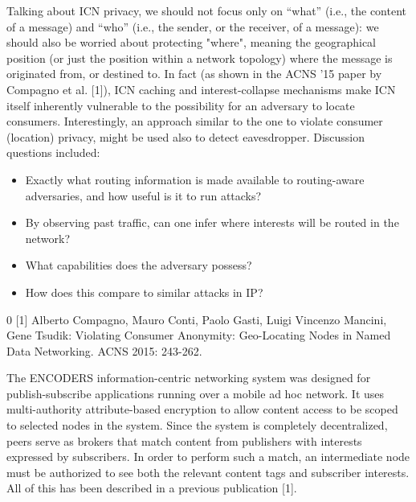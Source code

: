 \documentclass[a4paper,UKenglish]{dagrep}
\begin{document}
\license

Talking about ICN privacy, we should not focus only on ``what'' (i.e., the content of a message) and ``who'' (i.e., the sender, or the receiver, of a message): we should also be worried about protecting "where", meaning the geographical position (or just the position within a network topology) where the message is originated from, or destined to. In fact (as shown in the ACNS '15 paper by Compagno et al. [1]), ICN caching and interest-collapse mechanisms make ICN itself inherently vulnerable to the possibility for an adversary to locate consumers.
Interestingly, an approach similar to the one to violate consumer (location) privacy, might be used also to detect eavesdropper.
Discussion questions included:
\begin{itemize}
\item Exactly what routing information is made available to routing-aware adversaries, and how useful is it to run attacks?
\item By observing past traffic, can one infer where interests will be routed in the network?
\item What capabilities does the adversary possess?
\item How does this compare to similar attacks in IP?
\end{itemize}

\begin{thebibliography}{0}
[1] Alberto Compagno, Mauro Conti, Paolo Gasti, Luigi Vincenzo Mancini, Gene Tsudik:
Violating Consumer Anonymity: Geo-Locating Nodes in Named Data Networking. ACNS 2015: 243-262.
\end{thebibliography}


\license

The ENCODERS information-centric networking system was designed for publish-subscribe applications running over a mobile ad hoc network. It uses multi-authority attribute-based encryption to allow content access to be scoped to selected nodes in the system. Since the system is completely decentralized, peers serve as brokers that match content from publishers with interests expressed by subscribers. In order to perform such a match, an intermediate node must be authorized to see both the relevant content tags and  subscriber interests. All of this has been described in a previous publication [1].
\end{document}
